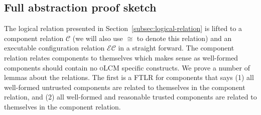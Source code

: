 \documentclass[acmsmall,review,anonymous]{acmart}\settopmatter{printfolios=true,printccs=false,printacmref=false}
\newcommand{\srccm}{\textsc{oLCM}}
\begin{document}
\subsection{Full abstraction proof sketch}
\label{subsec:proof-sketch}
The logical relation presented in Section~\ref{subsec:logical-relation} is lifted to a component relation $\mathcal{C}$ (we will also use $\cong$ to denote this relation) and an executable configuration relation $\mathcal{EC}$ in a straight forward.
The component relation relates components to themselves which makes sense as well-formed components should contain no \srccm{} specific constructs.
We prove a number of lemmas about the relations.
The first is a FTLR for components that says (1) all well-formed untrusted components are related to themselves in the component relation, and (2)  all well-formed and reasonable trusted components are related to themselves in the component relation.
\end{document}
